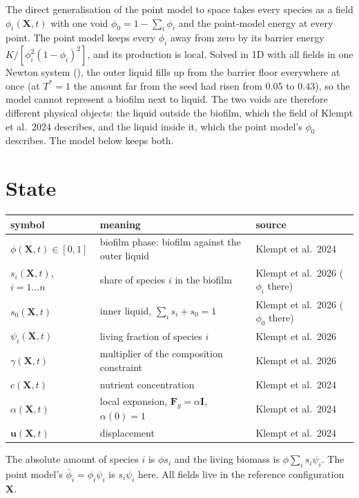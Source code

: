 \documentclass[11pt,a4paper]{article}
\newcommand{\living}{\textstyle\sum_i s_i\psi_i}
\begin{document}
The direct generalisation of the point model to space takes every species as a field
$\phi_i(\mathbf X,t)$ with one void $\phi_0=1-\sum_i\phi_i$ and the point-model energy at every
point. The point model keeps every $\phi_i$ away from zero by its barrier energy
$K/[\phi_i^2(1-\phi_i)^2]$, and its production is local. Solved in 1D with all fields in one
Newton system (), the outer liquid fills up from the barrier
floor everywhere at once (at $T^*=1$ the amount far from the seed had risen from $0.05$ to
$0.43$), so the model cannot represent a biofilm next to liquid. The two voids are therefore
different physical objects: the liquid outside the biofilm, which the field of Klempt et al.\
2024 describes, and the liquid inside it, which the point model's $\phi_0$ describes. The model
below keeps both.

\section{State}

\begin{center}
\begin{tabular}{@{}lll@{}}
\toprule
symbol & meaning & source\\
\midrule
$\phi(\mathbf X,t)\in[0,1]$ & biofilm phase: biofilm against the outer liquid & Klempt et al.\ 2024\\
$s_i(\mathbf X,t)$, $i=1\dots n$ & share of species $i$ in the biofilm & Klempt et al.\ 2026 ($\phi_i$ there)\\
$s_0(\mathbf X,t)$ & inner liquid, $\sum_is_i+s_0=1$ & Klempt et al.\ 2026 ($\phi_0$ there)\\
$\psi_i(\mathbf X,t)$ & living fraction of species $i$ & Klempt et al.\ 2026\\
$\gamma(\mathbf X,t)$ & multiplier of the composition constraint & Klempt et al.\ 2026\\
$c(\mathbf X,t)$ & nutrient concentration & Klempt et al.\ 2024\\
$\alpha(\mathbf X,t)$ & local expansion, $\mathbf F_g=\alpha\mathbf I$, $\alpha(0)=1$ & Klempt et al.\ 2024\\
$\mathbf u(\mathbf X,t)$ & displacement & Klempt et al.\ 2024\\
\bottomrule
\end{tabular}
\end{center}
The absolute amount of species $i$ is $\phi s_i$ and the living biomass is $\phi\living$. The
point model's $\bar\phi_i=\phi_i\psi_i$ is $s_i\psi_i$ here. All fields live in the reference
configuration $\mathbf X$.
\end{document}
